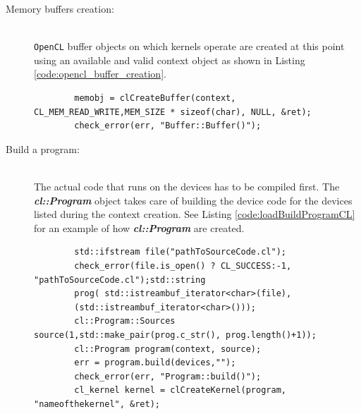 \begin{description}
\begin{description}
    	\item [Memory buffers creation:]\hfil \\ \texttt{OpenCL} buffer objects on which kernels operate are created at this point using an available and valid context object as shown in Listing \ref{code:opencl_buffer_creation}. 
    	\begin{lstlisting}
    	memobj = clCreateBuffer(context, CL_MEM_READ_WRITE,MEM_SIZE * sizeof(char), NULL, &ret);
    	check_error(err, "Buffer::Buffer()");
    	\end{lstlisting}
    	
    	\item [Build a program:]\hfil \\ 
    	The actual code that runs on the devices has to be compiled first. The \textbf{\textit{cl::Program}} object takes care of building the device code for the devices listed during the context creation. See Listing
    	\ref{code:loadBuildProgramCL} for an example of how \textbf{\textit{cl::Program}} are created.
    	\begin{lstlisting}
    	std::ifstream file("pathToSourceCode.cl");
    	check_error(file.is_open() ? CL_SUCCESS:-1, "pathToSourceCode.cl");std::string
    	prog( std::istreambuf_iterator<char>(file),
    	(std::istreambuf_iterator<char>()));
    	cl::Program::Sources source(1,std::make_pair(prog.c_str(), prog.length()+1));
    	cl::Program program(context, source);
    	err = program.build(devices,"");
    	check_error(err, "Program::build()");
    	cl_kernel kernel = clCreateKernel(program, "nameofthekernel", &ret);
    	\end{lstlisting}
    	

\end{description}
\end{description}
